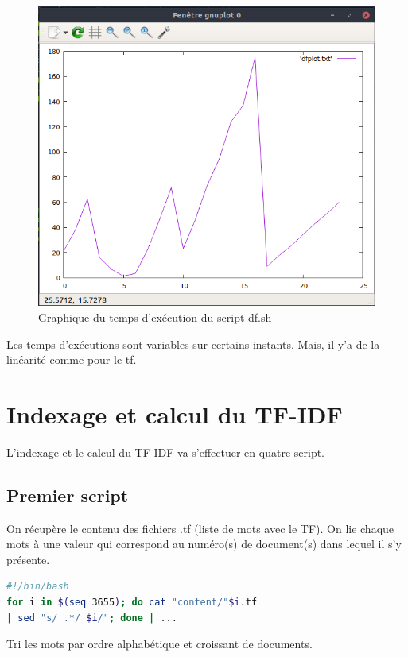 \documentclass{article}
\begin{document}
\begin{figure}[H]
\centering
\includegraphics[scale = 0.5]{"img/df.png"}
\caption{Graphique du temps d'exécution du script df.sh}
\end{figure}

Les temps d'exécutions sont variables sur certains instants. Mais, il y'a de la linéarité
comme pour le tf.

\section{Indexage et calcul du TF-IDF}

L'indexage et le calcul du TF-IDF va s'effectuer en quatre script. 

\subsection{Premier script}

On récupère le contenu des fichiers .tf (liste de mots avec le TF). On lie chaque mots à une valeur qui correspond au numéro(s) de document(s) dans lequel il s'y présente.

\begin{lstlisting}[language=bash,caption={Requête 1}]
#!/bin/bash
for i in $(seq 3655); do cat "content/"$i.tf 
| sed "s/ .*/ $i/"; done | ...
\end{lstlisting}

Tri les mots par ordre alphabétique et croissant de documents.
\end{document}
